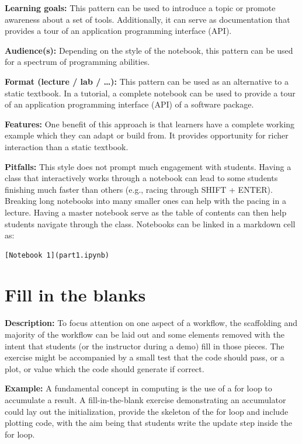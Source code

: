 \documentclass[]{book}
\begin{document}
\textbf{Learning goals:}
This pattern can be used to introduce a topic or promote awareness
about a set of tools. Additionally, it can serve as documentation that
provides a tour of an application programming interface (API).

\textbf{Audience(s):}
Depending on the style of the notebook, this pattern can be used for a spectrum
of programming abilities.

\textbf{Format (lecture / lab / \ldots):}
This pattern can be used as an alternative to a static textbook. In a
tutorial, a complete notebook can be used to provide a tour of an
application programming interface (API) of a software package.

\textbf{Features:}
One benefit of this approach is that learners have a complete working
example which they can adapt or build from. It provides opportunity
for richer interaction than a static textbook.

\textbf{Pitfalls:}
This style does not prompt much engagement with students. Having a
class that interactively works through a notebook can lead to some
students finishing much faster than others (e.g., racing through
SHIFT + ENTER). Breaking long notebooks into many smaller ones can help
with the pacing in a lecture. Having a master notebook serve as the
table of contents can then help students navigate through the
class. Notebooks can be linked in a markdown cell as:

\begin{verbatim}
[Notebook 1](part1.ipynb)
\end{verbatim}

\hypertarget{fill-in-the-blanks}{%
\section{Fill in the blanks}\label{fill-in-the-blanks}}

\textbf{Description:}
To focus attention on one aspect of a workflow, the
scaffolding and majority of the workflow can be laid out and some
elements removed with the intent that students (or the instructor
during a demo) fill in those pieces. The exercise might be accompanied
by a small test that the code should pass, or a plot, or value which
the code should generate if correct.

\textbf{Example:}
A fundamental concept in computing is the use of a for loop to
accumulate a result. A fill-in-the-blank exercise demonstrating an
accumulator could lay out the initialization, provide the skeleton of
the for loop and include plotting code, with the aim being that
students write the update step inside the for loop.
\end{document}
